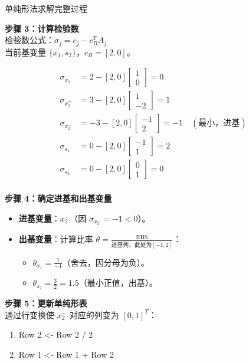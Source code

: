 \begin{exbox}{单纯形法求解完整过程}{}
        
        \textbf{步骤 3：计算检验数}\\
        检验数公式：\( \sigma_j = c_j - c_B^T A_j \) \\
        当前基变量 \( \{x_1, s_2\} \)，\( c_B = [2, 0] \)。
        
        \begin{align*}
        \sigma_{x_1} &= 2 - [2, 0] \begin{bmatrix}1\\0\end{bmatrix} = 0 \\
        \sigma_{x_2^+} &= 3 - [2, 0] \begin{bmatrix}1\\-2\end{bmatrix} = 1 \\
        \sigma_{x_2^-} &= -3 - [2, 0] \begin{bmatrix}-1\\2\end{bmatrix} = -1 \quad (\text{最小，进基}) \\
        \sigma_{s_1} &= 0 - [2, 0] \begin{bmatrix}-1\\1\end{bmatrix} = 2 \\
        \sigma_{s_2} &= 0 - [2, 0] \begin{bmatrix}0\\1\end{bmatrix} = 0 \\
        \end{align*}
        
        
        \textbf{步骤 4：确定进基和出基变量}
        \begin{itemize}
          \item \textbf{进基变量}：\( x_2^- \)（因 \( \sigma_{x_2^-} = -1 < 0 \)）。
          \item \textbf{出基变量}：计算比率 \( \theta = \frac{\text{RHS}}{\text{进基列，此处为}[-1, 2]} \)：
            \begin{itemize}
              \item \( \theta_{x_1} = \frac{7}{-1} \)（舍去，因分母为负）。
              \item \( \theta_{s_2} = \frac{3}{2} = 1.5 \)（最小正值，出基）。
            \end{itemize}
        \end{itemize}
        
        
        \textbf{步骤 5：更新单纯形表}\\
        通过行变换使 \( x_2^- \) 对应的列变为 \( [0, 1]^T \)：
        \begin{enumerate}
          \item Row 2 <- Row 2 / 2  
          \item Row 1 <- Row 1 + Row 2  
        \end{enumerate}
        

\end{exbox}
